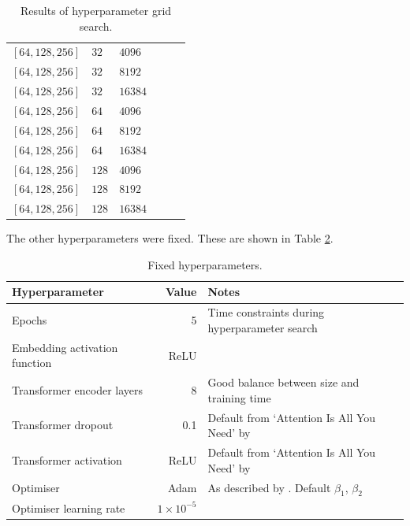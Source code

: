 \begin{table}[H]
\begin{adjustbox}{width=\textwidth}
\begin{tabular}{lll|rrr}
      

      $[64, 128, 256 ]$& $32$ & $4096$ & && \\
      $[64, 128, 256 ]$& $32$ & $8192$ & && \\
      $[64, 128, 256 ]$& $32$ & $16384$ & && \\[0.1cm]
      
      $[64, 128, 256 ]$& $64$ & $4096$ & && \\
      $[64, 128, 256 ]$& $64$ & $8192$ & && \\
      $[64, 128, 256 ]$& $64$ & $16384$ & && \\[0.1cm]
      
      $[64, 128, 256 ]$& $128$  & $4096$ & && \\
      $[64, 128, 256 ]$& $128$ & $8192$ & && \\
      $[64, 128, 256 ]$& $128$ & $16384$ & && \\

    \end{tabular}
  \end{adjustbox}
  \caption{Results of hyperparameter grid search.}
  \label{tabHyperparam}
\end{table}

The other hyperparameters were fixed. These are shown in Table
\ref{tabFixedparam}.

\begin{table}[H]
  \centering
  \begin{adjustbox}{width=\textwidth}
    \begin{tabular}{l|rl}

      Hyperparameter & Value & Notes \\
      \hline

      Epochs & 5 & Time constraints during hyperparameter search \\

      Embedding activation function & ReLU & \\

      Transformer encoder layers & 8 & Good balance between size and training
      time \\

      Transformer dropout & 0.1 & Default from `Attention Is All You Need' by
      \citet{attention}\\

      Transformer activation & ReLU & Default from `Attention Is All You Need'
      by \citet{attention} \\

      Optimiser & Adam & As described by \citet{kingma2014adam}. Default
      $\beta_1$, $\beta_2$ \\

      Optimiser learning rate & $1\times10^{-5}$ &

    \end{tabular}
  \end{adjustbox}
  \caption{Fixed hyperparameters.}
  \label{tabFixedparam}
\end{table}

